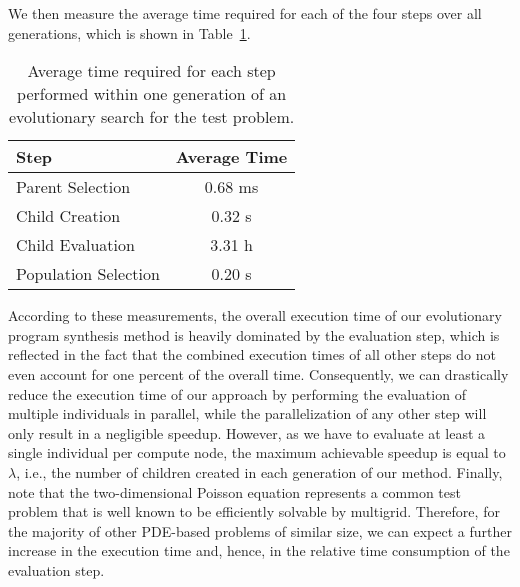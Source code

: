 We then measure the average time required for each of the four steps over all generations, which is shown in Table~\ref{table:evolutionary-search-profiling}.
\begin{table}
	\caption{Average time required for each step performed within one generation of an evolutionary search for the test problem.}
	\label{table:evolutionary-search-profiling}
	\centering
	\begin{tabular}{l c}
		\toprule
		Step & Average Time \\
		\midrule
		Parent Selection & 0.68 ms \\
		\midrule
		Child Creation  & 0.32 s \\
		\midrule
		Child Evaluation  & 3.31 h \\
		\midrule
		Population Selection  & 0.20 s \\
		\bottomrule
	\end{tabular}
\end{table}
According to these measurements, the overall execution time of our evolutionary program synthesis method is heavily dominated by the evaluation step, which is reflected in the fact that the combined execution times of all other steps do not even account for one percent of the overall time.
Consequently, we can drastically reduce the execution time of our approach by performing the evaluation of multiple individuals in parallel, while the parallelization of any other step will only result in a negligible speedup. 
However, as we have to evaluate at least a single individual per compute node, the maximum achievable speedup is equal to $\lambda$, i.e., the number of children created in each generation of our method.
Finally, note that the two-dimensional Poisson equation represents a common test problem that is well known to be efficiently solvable by multigrid.
Therefore, for the majority of other PDE-based problems of similar size, we can expect a further increase in the execution time and, hence, in the relative time consumption of the evaluation step.

